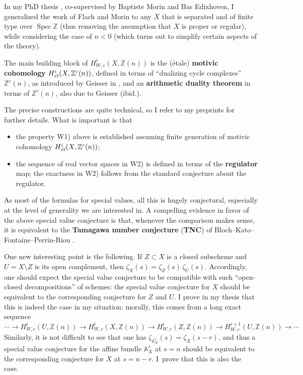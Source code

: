 \documentclass{article}
\DeclareMathOperator{\Spec}{Spec}
\newcommand{\ZZ}{\mathbb{Z}}
\renewcommand{\AA}{\mathbb{A}}
\begin{document}
In my PhD thesis \cite{These}, co-supervised by Baptiste Morin and Bas
Edixhoven, I generalized the work of Flach and Morin to any $X$ that is
separated and of finite type over $\Spec \ZZ$ (thus removing the assumption that
$X$ is proper or regular), while considering the case of $n < 0$
(which turns out to simplify certain aspects of the theory).

The main building block of $H^i_{W,c} (X,\ZZ(n))$ is the (étale)
\textbf{motivic cohomology} $H^i_\text{\it ét} (X, \ZZ^c (n))$, defined in terms
of ``dualizing cycle complexes'' $\ZZ^c (n)$, as introduced by Geisser in
\cite{Geisser-2010}, and an \textbf{arithmetic duality theorem} in terms of
$\ZZ^c (n)$, also due to Geisser (ibid.).

The precise constructions are quite technical, so I refer to my preprints
\cite{Weil-etale-preprint-1,Weil-etale-preprint-2} for further details.
What is important is that
\begin{itemize}
\item the property W1) above is established assuming finite generation of
  motivic cohomology $H^i_\text{\it ét} (X, \ZZ^c (n))$;

\item the sequence of real vector spaces in W2) is defined in terms of the
  \textbf{regulator} map; the exactness in W2) follows from the standard
  conjecture about the regulator.
\end{itemize}


As most of the formulas for special values, all this is hugely conjectural,
especially at the level of generality we are interested in. A compelling
evidence in favor of the above special value conjecture is that, whenever the
comparison makes sense, it is equivalent to the \textbf{Tamagawa number
  conjecture} (\textbf{TNC}) of Bloch--Kato--Fontaine--Perrin-Riou
\cite{Fontaine-Perrin-Riou}.

One new interesting point is the following. If $Z \subset X$ is a closed
subscheme and $U = X\setminus Z$ is its open complement, then
$\zeta_X (s) = \zeta_Z (s) \, \zeta_U (s)$. Accordingly, one should expect the
special value conjecture to be compatible with such ``open-closed
decompositions'' of schemes: the special value conjecture for $X$ should be
equivalent to the corresponding conjecture for $Z$ and $U$. I prove in my
thesis that this is indeed the case in my situation: morally, this comes from a
long exact sequence
\[ \cdots \to H^i_{W,c} (U,\ZZ(n)) \to H^i_{W,c} (X,\ZZ(n)) \to H^i_{W,c} (Z,\ZZ(n)) \to H^{i+1}_{W,c} (U,\ZZ(n)) \to \cdots \]
Similarly, it is not difficult to see that one has
$\zeta_{\AA^r_X} (s) = \zeta_X (s-r)$, and thus a special value conjecture for
the affine bundle $\AA^r_X$ at $s = n$ should be equivalent to the corresponding
conjecture for $X$ at $s = n-r$. I~prove that this is also the case.
\end{document}
